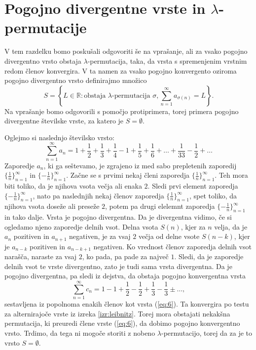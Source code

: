 \documentclass[12pt,a4paper,reqno]{amsart}
\theoremstyle{definition} %
\theoremstyle{plain} %
\begin{document}
\section{Pogojno divergentne vrste in $\lambda$-permutacije}

V tem razdelku bomo poskušali odgovoriti še na vprašanje, ali za vsako pogojno divergentno vrsto obstaja $\lambda$-permutacija, taka, da vrsta s spremenjenim vrstnim redom členov konvergira. V ta namen za vsako pogojno konvergento oziroma pogojno divergentno vrsto definirajmo množico $$S=\left \{L\in \mathbb{R}:\textrm{obstaja }\lambda \textrm{-permutacija } \sigma, \sum^{\infty}_{n=1}a_{\sigma (n)}=L\right \}.$$ Na vprašanje bomo odgovorili s pomočjo protiprimera, torej primera pogojno divergentne številske vrste, za katero je $S=\emptyset$. %

Oglejmo si naslednjo številsko vrsto:
\begin{equation}\label{eq:6}
\sum^{\infty}_{n=1}a_n = 1+\frac{1}{2}+\frac{1}{3}+\frac{1}{4}-1+\frac{1}{5}+\frac{1}{6}+ \dots +\frac{1}{33}-\frac{1}{2}+\dots
\end{equation}
Zaporedje $a_n$, ki ga seštevamo, je zgrajeno iz med sabo prepletenih zaporedij $\{\frac{1}{n}\}_{n=1}^{\infty}$ in $\{-\frac{1}{n}\}_{n=1}^{\infty}$. Začne se s prvimi nekaj členi zaporedja $\{\frac{1}{n}\}_{n=1}^{\infty}$. Teh mora biti toliko, da je njihova vsota večja ali enaka $2$. Sledi prvi element zaporedja $\{-\frac{1}{n}\}_{n=1}^{\infty}$, nato pa naslednjih nekaj členov zaporedja $\{\frac{1}{n}\}_{n=1}^{\infty}$, spet toliko, da njihova vsota doseže ali preseže $2$, potem pa drugi elelemnt zaporedja $\{-\frac{1}{n}\}_{n=1}^{\infty}$ in tako dalje. 
Vrsta je pogojno divergentna. Da je divergentna vidimo, če si ogledamo njeno zaporedje delnih vsot. Delna vsota $S(n)$, kjer za $n$ velja, da je $a_n$ pozitiven in $a_{n+1}$ negativen, je za vsaj $2$ večja od delne vsote $S(n-k)$, kjer je $a_{n-k}$ pozitiven in $a_{n-k+1}$ negativen. Ko vrednost členov zaporedja delnih vsot narašča, naraste za vsaj $2$, ko pada, pa pade za največ $1$. Sledi, da je zaporedje delnih vsot te vrste divergentno, zato je tudi sama vrsta divergentna.
Da je pogojno divergentna, pa sledi iz dejstva, da obstaja pogojno konvergentna vrsta $$\sum_{n=1}^{\infty}c_n=1-1+\frac{1}{2}-\frac{1}{2}+\frac{1}{3}-\frac{1}{3}\pm \ldots,$$ 
sestavljena iz popolnoma enakih členov kot vrsta (\ref{eq:6}). Ta konvergira po testu za alternirajoče vrste iz izreka \ref{izr:leibnitz}.
Torej mora obstajati nekakšna permutacija, ki preuredi člene vrste (\ref{eq:6}), da dobimo pogojno konvergentno vrsto.
Trdimo, da tega ni mogoče storiti z nobeno $\lambda$-permutacijo, torej da za je to vrsto $S=\emptyset$. 
\end{document}
